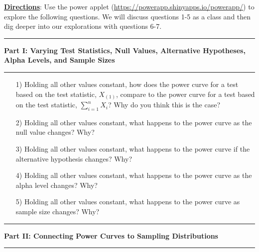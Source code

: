 \documentclass{TISE}
\begin{document}
\textbf{\underline{Directions}}: Use the power applet (\url{https://powerapp.shinyapps.io/powerapp/}) to explore the following questions. We will discuss questions 1-5 as a class and then dig deeper into our explorations with questions 6-7.

\begin{center}
	\hrule 
	\textbf{Part I: Varying Test Statistics, Null Values, Alternative Hypotheses, Alpha Levels, and Sample Sizes}
	\hrule
\end{center}

\begin{enumerate}
	\item[1)] Holding all other values constant, how does the power curve for a test based on the test statistic, $X_{(1)}$, compare to the power curve for a test based on the test statistic, $\sum_{i=1}^n X_i$? Why do you think this is the case?
	
	\vspace{1.5in}
	
	\item[2)] Holding all other values constant, what happens to the power curve as the null value changes? Why?
	
	\vspace{1.5in}
	
	\item[3)] Holding all other values constant, what happens to the power curve if the alternative hypothesis changes? Why?
	
	\vspace{1.5in}
	
	\item[4)] Holding all other values constant, what happens to the power curve as the alpha level changes? Why? 
	
	\vspace{1.5in}
	
	\item[5)] Holding all other values constant, what happens to the power curve as sample size changes? Why?
	
	\vspace{1.5in}
\end{enumerate}

\begin{center}
	\hrule
	\textbf{Part II: Connecting Power Curves to Sampling Distributions}	
	\hrule
\end{center}
\end{document}
